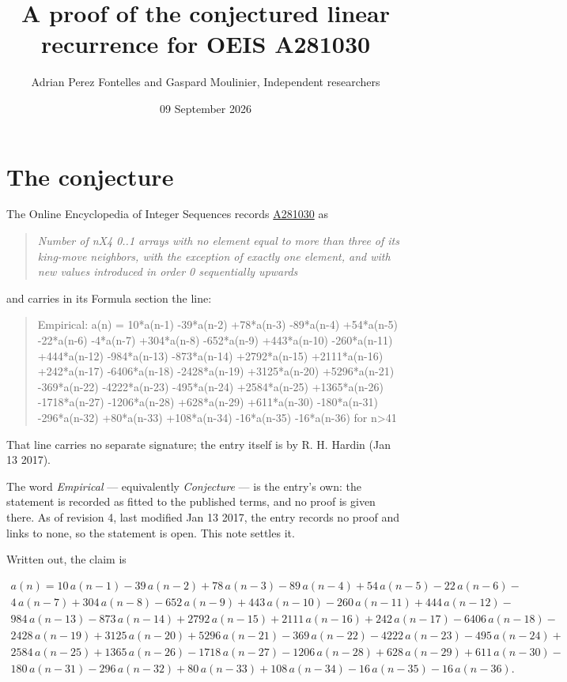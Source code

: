 \documentclass[11pt]{article}
\title{A proof of the conjectured linear recurrence for OEIS A281030}
\author{Adrian Perez Fontelles and Gaspard Moulinier, Independent researchers}
\date{09 September 2026}
\theoremstyle{definition}
\begin{document}
\maketitle
\section{The conjecture}

The Online Encyclopedia of Integer Sequences records \href{https://oeis.org/A281030}{A281030} as

\begin{quote}\itshape Number of nX4 0..1 arrays with no element equal to more than three of its king-move neighbors, with the exception of exactly one element, and with new values introduced in order 0 sequentially upwards\end{quote}

and carries in its Formula section the line:

\begin{quote}\ttfamily Empirical: a(n) = 10*a(n-1) -39*a(n-2) +78*a(n-3) -89*a(n-4) +54*a(n-5) -22*a(n-6) -4*a(n-7) +304*a(n-8) -652*a(n-9) +443*a(n-10) -260*a(n-11) +444*a(n-12) -984*a(n-13) -873*a(n-14) +2792*a(n-15) +2111*a(n-16) +242*a(n-17) -6406*a(n-18) -2428*a(n-19) +3125*a(n-20) +5296*a(n-21) -369*a(n-22) -4222*a(n-23) -495*a(n-24) +2584*a(n-25) +1365*a(n-26) -1718*a(n-27) -1206*a(n-28) +628*a(n-29) +611*a(n-30) -180*a(n-31) -296*a(n-32) +80*a(n-33) +108*a(n-34) -16*a(n-35) -16*a(n-36) for n>41\end{quote}

That line carries no separate signature; the entry itself is by R. H. Hardin (Jan 13 2017).

The word {\itshape Empirical} --- equivalently {\itshape Conjecture} --- is the entry's own: the statement is recorded as fitted to the published terms, and no proof is given there. As of revision 4, last modified Jan 13 2017, the entry records no proof and links to none, so the statement is open. This note settles it.

Written out, the claim is

\begin{multline*} a(n) = 10\,a(n-1) - 39\,a(n-2) + 78\,a(n-3) - 89\,a(n-4) + 54\,a(n-5) - 22\,a(n-6) - \\ 4\,a(n-7) + 304\,a(n-8) - 652\,a(n-9) + 443\,a(n-10) - 260\,a(n-11) + 444\,a(n-12) - \\ 984\,a(n-13) - 873\,a(n-14) + 2792\,a(n-15) + 2111\,a(n-16) + 242\,a(n-17) - 6406\,a(n-18) - \\ 2428\,a(n-19) + 3125\,a(n-20) + 5296\,a(n-21) - 369\,a(n-22) - 4222\,a(n-23) - 495\,a(n-24) + \\ 2584\,a(n-25) + 1365\,a(n-26) - 1718\,a(n-27) - 1206\,a(n-28) + 628\,a(n-29) + 611\,a(n-30) - \\ 180\,a(n-31) - 296\,a(n-32) + 80\,a(n-33) + 108\,a(n-34) - 16\,a(n-35) - 16\,a(n-36). \end{multline*}
\end{document}
